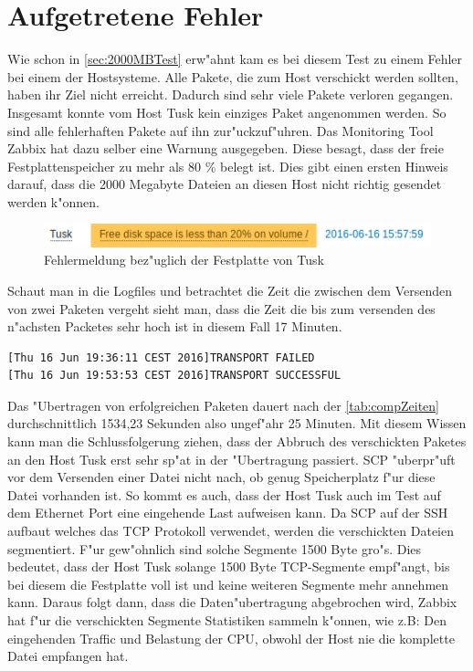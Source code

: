 \section{Aufgetretene Fehler}
\label{sec:fehler}

Wie schon in \cref{sec:2000MBTest} erw"ahnt kam es bei diesem Test zu einem Fehler %
bei einem der Hostsysteme. Alle Pakete, die zum Host verschickt werden sollten, %
haben ihr Ziel nicht erreicht. Dadurch sind sehr viele Pakete verloren gegangen. %
Insgesamt konnte vom Host Tusk kein einziges Paket angenommen werden. So sind alle %
fehlerhaften Pakete auf ihn zur"uckzuf"uhren. Das Monitoring Tool Zabbix hat dazu selber %
eine Warnung ausgegeben. Diese besagt, dass der freie Festplattenspeicher zu mehr als 80 \% %
belegt ist. Dies gibt einen ersten Hinweis darauf, dass die 2000 Megabyte Dateien an %
diesen Host nicht richtig gesendet werden k"onnen.  

\begin{figure}[htbp]
\centering
\includegraphics*[width=1\linewidth]{Abb/Tusk20prozent}

\caption{Fehlermeldung bez"uglich der Festplatte von Tusk}
\label{fig:Eth0DazzleStandard}
\end{figure}

Schaut man in die Logfiles und betrachtet die Zeit die zwischen dem Versenden von zwei Paketen vergeht sieht %
man, dass die Zeit die bis zum versenden des n"achsten Packetes %
sehr hoch ist in diesem Fall 17 Minuten. 

\begin{verbatim}
[Thu 16 Jun 19:36:11 CEST 2016]TRANSPORT FAILED 
[Thu 16 Jun 19:53:53 CEST 2016]TRANSPORT SUCCESSFUL
\end{verbatim} 

Das "Ubertragen von erfolgreichen Paketen dauert nach der \cref{tab:compZeiten} durchschnittlich 1534,23 Sekunden %
also ungef"ahr 25 Minuten. Mit diesem Wissen kann man die Schlussfolgerung ziehen, dass der Abbruch des verschickten %
Paketes an den Host Tusk erst sehr sp"at in der "Ubertragung passiert. SCP "uberpr"uft vor dem Versenden einer Datei nicht %
nach, ob genug Speicherplatz f"ur diese Datei vorhanden ist. So kommt es auch, dass der Host Tusk auch im %
Test auf dem Ethernet Port eine eingehende Last aufweisen kann. Da SCP auf der SSH aufbaut welches das %
TCP Protokoll verwendet, werden die verschickten Dateien segmentiert. F"ur gew"ohnlich sind solche Segmente %
1500 Byte gro"s. Dies bedeutet, dass der Host Tusk solange 1500 Byte TCP-Segmente empf"angt, bis bei diesem %
die Festplatte voll ist und keine weiteren Segmente mehr annehmen kann. Daraus folgt dann, dass die Daten"ubertragung %
abgebrochen wird, Zabbix hat f"ur die verschickten Segmente Statistiken sammeln k"onnen, wie z.B: Den eingehenden %
Traffic und Belastung der CPU, obwohl der Host nie die komplette Datei empfangen hat. %
